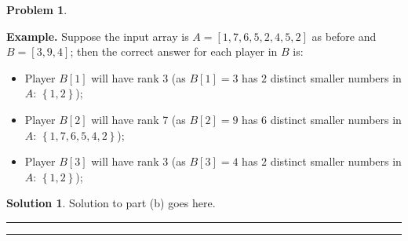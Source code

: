 \documentclass{article}
\theoremstyle{definition}
\newtheorem{problem}{Problem}
\def\fline{\rule{0.75\linewidth}{0.5pt}}
\newcommand{\finishline}{\begin{center}\fline\end{center}}
\newtheorem*{solution*}{Solution}
\newenvironment{solution}{\begin{solution*}}{{\finishline} \end{solution*}}
\newcommand{\set}[1]{\ensuremath{\left\{ #1 \right\}}}
\begin{document}
\begin{problem}
\begin{enumerate}
      \medskip
  \textbf{Example.} Suppose the input array is $A=[1,7,6,5,2,4,5,2]$ as before and $B=[3,9,4]$; then the correct answer for each player in $B$ is: 
    \begin{itemize}
        \item Player $B[1]$ will have rank 3 (as $B[1]=3$ has $2$ distinct smaller numbers in $A$: $\set{1,2}$); 
        \item Player $B[2]$ will have rank 7 (as $B[2]=9$ has $6$ distinct smaller numbers in $A$: $\set{1,7,6,5,4,2}$);
        \item Player $B[3]$ will have rank 3 (as $B[3]=4$ has $2$ distinct smaller numbers in $A$: $\set{1,2}$);
    \end{itemize}
    
    
    		    \begin{solution}
	Solution to part (b) goes here. %
\end{solution}

    
    \end{enumerate}
    
\end{problem}


\smallskip

\finishline
\end{document}
